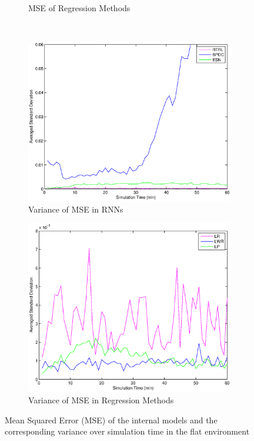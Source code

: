 \documentclass[msc,ai,logo]{infthesis}
\begin{document}
\begin{figure}[H]
\begin{subfigure}[b]{0.49\textwidth}
                \caption{MSE of Regression Methods}
               \label{fig:LR_00_MSE}  
        \end{subfigure}
        ~ %
        \begin{subfigure}[b]{0.49\textwidth}
                \centering
                \includegraphics[width=\textwidth]{RNN_00_MSEvar.eps}
                \caption{Variance of MSE in RNNs} 
                \label{fig:RNN_00_MSEvar}
        \end{subfigure}
\begin{subfigure}[b]{0.49\textwidth}
                \centering
                \includegraphics[width=\textwidth]{LR_00_MSEvar.eps}
                \caption{Variance of MSE in Regression Methods}
         \label{fig:LR_00_MSEvar}        
        \end{subfigure}
        \caption{Mean Squared Error (MSE) of the internal models and the corresponding variance over simulation time in the flat environment}
\end{figure}
\end{document}
